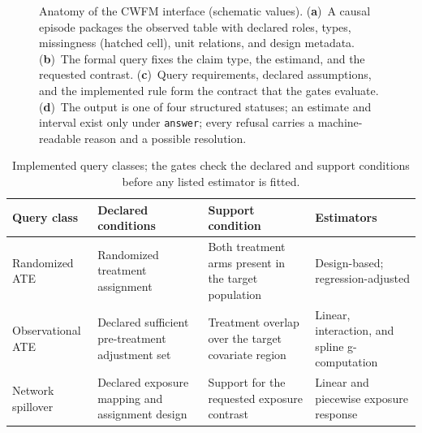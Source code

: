\documentclass[electronics,article,submit,oneauthor]{Definitions/mdpi}
\providecommand{\Tiny}{\fontsize{6}{7}\selectfont}
\begin{document}
\begin{figure}[!t]
\caption{Anatomy of the CWFM interface (schematic values). (\textbf{a})~A causal episode packages the observed table with declared roles, types, missingness (hatched cell), unit relations, and design metadata. (\textbf{b})~The formal query fixes the claim type, the estimand, and the requested contrast. (\textbf{c})~Query requirements, declared assumptions, and the implemented rule form the contract that the gates evaluate. (\textbf{d})~The output is one of four structured statuses; an estimate and interval exist only under \texttt{answer}; every refusal carries a machine-readable reason and a possible resolution.}
\label{fig:episode}
\end{figure}

\begin{table}[!t]
\caption{Implemented query classes; the gates check the declared and support conditions before any listed estimator is fitted.\label{tab:queryclasses}}
\footnotesize
\begin{tabularx}{\textwidth}{lXXX}
\toprule
\textbf{Query class} & \textbf{Declared conditions} & \textbf{Support condition} & \textbf{Estimators}\\
\midrule
Randomized ATE & Randomized treatment assignment & Both treatment arms present in the target population & Design-based; regression-adjusted\\
Observational ATE & Declared sufficient pre-treatment adjustment set & Treatment overlap over the target covariate region & Linear, interaction, and spline g-computation\\
Network spillover & Declared exposure mapping and assignment design & Support for the requested exposure contrast & Linear and piecewise exposure response\\
\bottomrule
\end{tabularx}
\end{table}
\end{document}
